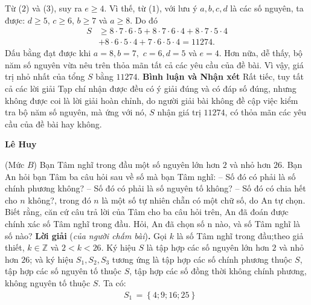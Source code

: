 	\begin{multicols}{2}
	\setlength{\abovedisplayskip}{4pt}
	\setlength{\belowdisplayskip}{4pt}
	Từ ($2$) và ($3$), suy ra $e\ge 4$. Vì thế, từ ($1$), với lưu ý $a, b, c, d$ là các số nguyên, ta được: $d\ge 5$, $c\ge 6$, $b\ge 7$ và $a\ge 8$. Do đó
	\begin{align*}
		S &\ge 8 \cdot 7 \cdot 6 \cdot 5 + 8 \cdot 7 \cdot 6 \cdot 4 + 8 \cdot 7 \cdot 5 \cdot 4 \\
		&+ 8 \cdot 6 \cdot 5 \cdot 4 + 7 \cdot 6 \cdot 5 \cdot 4 = 11274.
	\end{align*}
	Dấu bằng đạt được khi $a= 8, b= 7,$ \linebreak$c= 6, d= 5$ và $e= 4$.
	\vskip 0.05cm
	Hơn nữa, dễ thấy, bộ năm số nguyên vừa nêu trên thỏa mãn tất cả các yêu cầu của đề bài.
	\vskip 0.05cm
	Vì vậy, giá trị nhỏ nhất của tổng $S$ bằng $11274$.
	\vskip 0.05cm
	\textbf{\color{thachthuctoanhoc}Bình luận và Nhận xét}
	\vskip 0.05cm
	Rất tiếc, tuy tất cả các lời giải Tạp chí nhận được đều có ý giải đúng và có đáp số đúng, nhưng không được coi là lời giải hoàn chỉnh, do người giải bài không đề cập việc kiểm tra bộ năm số nguyên, mà ứng với nó, $S$ nhận giá trị $11274$, có thỏa mãn các yêu cầu của đề bài hay không.
	\begin{flushright}
		\textbf{\color{thachthuctoanhoc}Lê Huy}
	\end{flushright}
	{}
	(Mức $B$) Bạn Tâm nghĩ trong đầu một số nguyên lớn hơn $2$ và nhỏ hơn $26$. Bạn An hỏi bạn Tâm ba câu hỏi sau về số mà bạn Tâm nghĩ:
	\vskip 0.05cm
	-- Số đó có phải là số chính phương không?
	\vskip 0.05cm
	-- Số đó có phải là số nguyên tố không?
	\vskip 0.05cm
	-- Số đó có chia hết cho $n$ không?,
	\vskip 0.05cm
	trong đó $n$ là một số tự nhiên chẵn có một chữ số, do An tự chọn.
	\vskip 0.05cm
	Biết rằng, căn cứ câu trả lời của Tâm cho ba câu hỏi trên, An đã đoán được chính xác số Tâm nghĩ trong đầu. Hỏi, An đã chọn số n nào, và số Tâm nghĩ là số nào?
	\vskip 0.05cm
	\textbf{\color{thachthuctoanhoc}Lời giải} (\textit{của người chấm bài})\textbf{\color{thachthuctoanhoc}.}
	\vskip 0.05cm
	Gọi $k$ là số Tâm nghĩ trong đầu;theo giả thiết, $k \in \mathbb{Z}$  và $2 <k< 26$.
	\vskip 0.05cm
	Ký hiệu $S$ là tập hợp các số nguyên lớn hơn $2$ và nhỏ hơn $26$; và ký hiệu $S_1, S_2, S_3$  tương ứng là tập hợp các số chính phương thuộc $S$, tập hợp các số nguyên tố thuộc $S$, tập hợp các số đồng thời không chính phương, không nguyên tố thuộc $S$. Ta có:
	\begin{align*}
		&{S_1}\, = \left\{ {4;9;16;25} \right\}\\

\end{align*}
\end{multicols}
